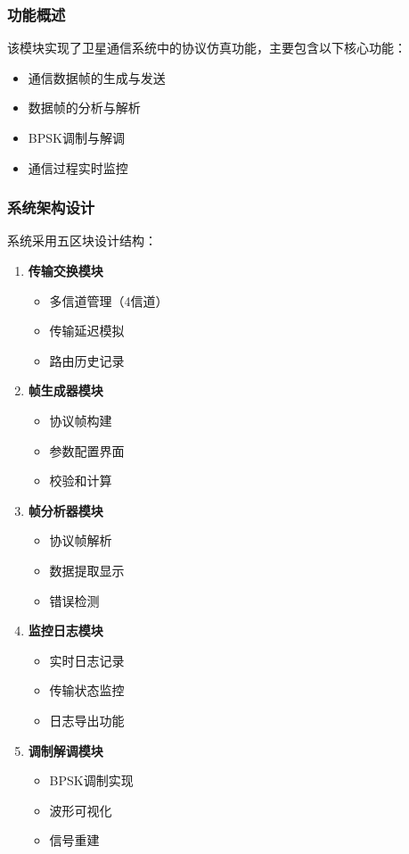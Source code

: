 \documentclass[12pt]{article}
\begin{document}
\subsubsection{功能概述}
该模块实现了卫星通信系统中的协议仿真功能，主要包含以下核心功能：
\begin{itemize}
    \item 通信数据帧的生成与发送
    \item 数据帧的分析与解析
    \item BPSK调制与解调
    \item 通信过程实时监控
\end{itemize}

\subsubsection{系统架构设计}
系统采用五区块设计结构：
\begin{enumerate}
    \item \textbf{传输交换模块}
    \begin{itemize}
        \item 多信道管理（4信道）
        \item 传输延迟模拟
        \item 路由历史记录
    \end{itemize}
    
    \item \textbf{帧生成器模块}
    \begin{itemize}
        \item 协议帧构建
        \item 参数配置界面
        \item 校验和计算
    \end{itemize}
    
    \item \textbf{帧分析器模块}
    \begin{itemize}
        \item 协议帧解析
        \item 数据提取显示
        \item 错误检测
    \end{itemize}

    \item \textbf{监控日志模块}
    \begin{itemize}
        \item 实时日志记录
        \item 传输状态监控
        \item 日志导出功能
    \end{itemize}

    \item \textbf{调制解调模块}
    \begin{itemize}
        \item BPSK调制实现
        \item 波形可视化
        \item 信号重建
    \end{itemize}
\end{enumerate}
\end{document}
